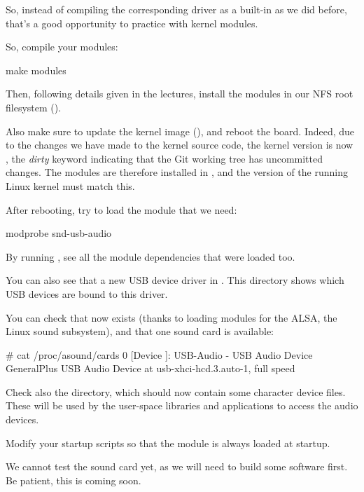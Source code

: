 So, instead of compiling the corresponding driver as a built-in as
we did before, that's a good opportunity to practice with kernel modules.

So, compile your modules:
\begin{bashinput}
make modules
\end{bashinput}

Then, following details given in the lectures, install the modules in our NFS
root filesystem ().

Also make sure to update the kernel image (), and reboot the
board.  Indeed, due to the changes we have made to the kernel source code,
the kernel version is now , the {\em dirty}
keyword indicating that the Git working tree has uncommitted changes.
The modules are therefore installed in ,
and the version of the running Linux kernel must match this.

After rebooting, try to load the module that we need:

\begin{bashinput}
modprobe snd-usb-audio
\end{bashinput}

By running , see all the module dependencies that
were loaded too.

You can also see that a new USB device driver in
. This directory shows which
USB devices are bound to this driver.

You can check that  now exists (thanks to loading
modules for the ALSA, the Linux sound subsystem), and that one sound
card is available:

\begin{bashinput}
# cat /proc/asound/cards
 0 [Device         ]: USB-Audio - USB Audio Device
                      GeneralPlus USB Audio Device at usb-xhci-hcd.3.auto-1, full speed
\end{bashinput}

Check also the  directory, which should now contain
some character device files. These will be used by the user-space
libraries and applications to access the audio devices.

Modify your startup scripts so that the  module
is always loaded at startup.

We cannot test the sound card yet, as we will need to build some
software first. Be patient, this is coming soon.

